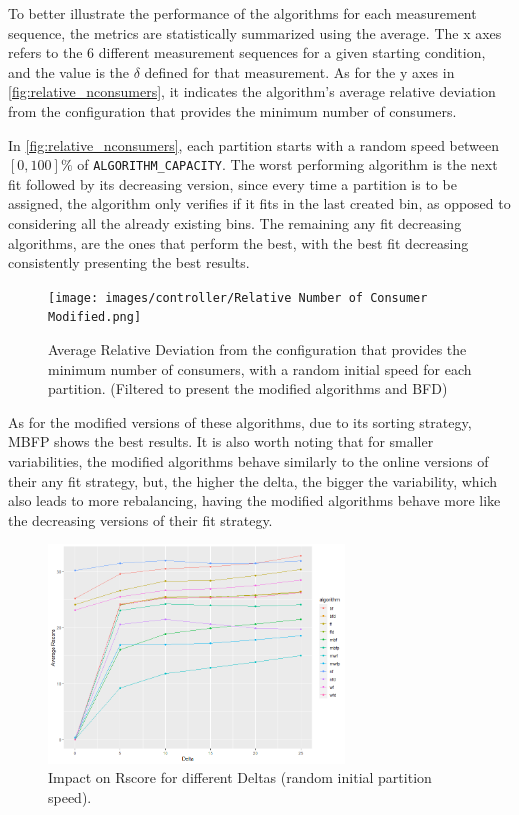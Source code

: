 To better illustrate the performance of the algorithms for each measurement
    sequence, the metrics are statistically summarized using the average. The x
    axes refers to the 6 different measurement sequences for a given starting
    condition, and the value is the $\delta$ defined for that measurement. As
    for the y axes in \ref{fig:relative_nconsumers}, it indicates the
    algorithm's average relative deviation from the configuration that provides
    the minimum number of consumers.

In \ref{fig:relative_nconsumers}, each partition starts with a random speed
    between $[0,100]\%$ of \lstinline[language=Python]{ALGORITHM_CAPACITY}. The
    worst performing algorithm is the next fit followed by its decreasing
    version, since every time a partition is to be assigned, the algorithm only
    verifies if it fits in the last created bin, as opposed to considering all
    the already existing bins. The remaining any fit decreasing algorithms, are
    the ones that perform the best, with the best fit decreasing consistently
    presenting the best results. 

\begin{figure}[H] \centering
    \texttt{[image: images/controller/Relative Number of
    Consumer Modified.png]} \caption{Average Relative Deviation from the
    configuration that provides the minimum number of consumers, with a random
    initial speed for each partition. (Filtered to present the modified
    algorithms and BFD)} \label{fig:relative_nconsumers_modified} \end{figure}

As for the modified versions of these algorithms, due to its sorting strategy,
MBFP shows the best results. It is also worth noting that for smaller
variabilities, the modified algorithms behave similarly to the online versions
of their any fit strategy, but, the higher the delta, the bigger the
variability, which also leads to more rebalancing, having the modified
algorithms behave more like the decreasing versions of their fit strategy.

\begin{figure}[H] 
    \centering
    \includegraphics[width=0.7\textwidth]{images/controller/Rscore.png}
    \caption{
        Impact on Rscore for different Deltas (random initial partition speed).
    } 
    \label{fig:rscore} 
\end{figure}

